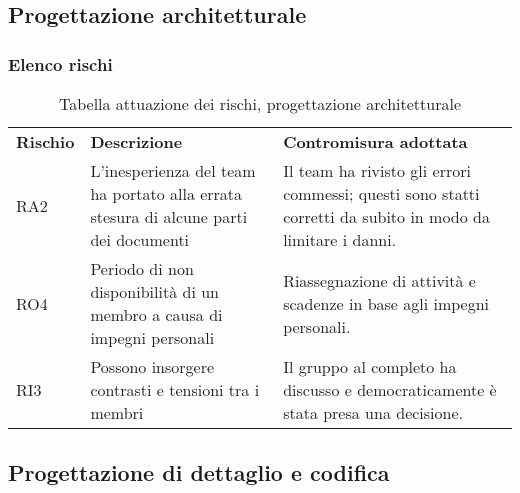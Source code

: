 \newpage
\subsection{Progettazione architetturale}
\subsubsection{Elenco rischi}
\begin{longtable}{|p{2cm}|p{6cm}|p{6cm}|}
	\arrayrulecolor{white}
	\caption{Tabella attuazione dei rischi, progettazione architetturale} \\
	\hline
	\rowcolor{header}
	\textbf{Rischio} & \textbf{Descrizione} & \textbf{Contromisura adottata} \\
	\hline
	RA2              & L'inesperienza del team ha portato alla errata stesura di alcune parti dei documenti & Il team ha rivisto gli errori commessi; questi sono statti corretti da subito in modo da limitare i danni.
	\\
	RO4 & Periodo di non disponibilità di un membro a causa di impegni personali & Riassegnazione di attività e scadenze in base agli impegni personali.
	\\
	RI3 & Possono insorgere contrasti e tensioni tra i membri & Il gruppo al completo ha discusso e democraticamente è stata presa una decisione.
\end{longtable}



\newpage
\subsection{Progettazione di dettaglio e codifica}
